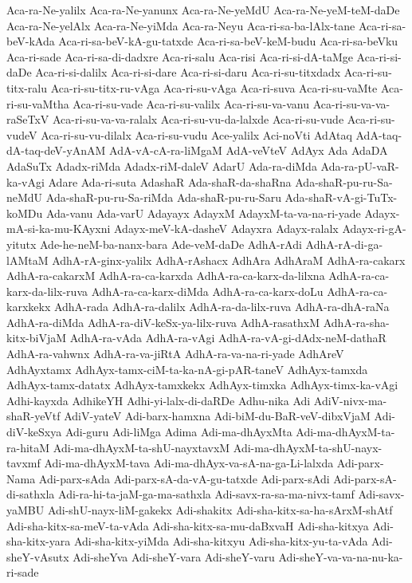 {Aca-ra-Ne-yalilx
Aca-ra-Ne-yanunx
Aca-ra-Ne-yeMdU
Aca-ra-Ne-yeM-teM-daDe
Aca-ra-Ne-yelAlx
Aca-ra-Ne-yiMda
Aca-ra-Neyu
Aca-ri-sa-ba-lAlx-tane
Aca-ri-sa-beV-kAda
Aca-ri-sa-beV-kA-gu-tatxde
Aca-ri-sa-beV-keM-budu
Aca-ri-sa-beVku
Aca-ri-sade
Aca-ri-sa-di-dadxre
Aca-ri-salu
Aca-risi
Aca-ri-si-dA-taMge
Aca-ri-si-daDe
Aca-ri-si-dalilx
Aca-ri-si-dare
Aca-ri-si-daru
Aca-ri-su-titxdadx
Aca-ri-su-titx-ralu
Aca-ri-su-titx-ru-vAga
Aca-ri-su-vAga
Aca-ri-suva
Aca-ri-su-vaMte
Aca-ri-su-vaMtha
Aca-ri-su-vade
Aca-ri-su-valilx
Aca-ri-su-va-vanu
Aca-ri-su-va-va-raSeTxV
Aca-ri-su-va-va-ralalx
Aca-ri-su-vu-da-lalxde
Aca-ri-su-vude
Aca-ri-su-vudeV
Aca-ri-su-vu-dilalx
Aca-ri-su-vudu
Ace-yalilx
Aci-noVti
AdAtaq
AdA-taq-dA-taq-deV-yAnAM
AdA-vA-cA-ra-liMgaM
AdA-veVteV
AdAyx
Ada
AdaDA
AdaSuTx
Adadx-riMda
Adadx-riM-daleV
AdarU
Ada-ra-diMda
Ada-ra-pU-vaR-ka-vAgi
Adare
Ada-ri-suta
AdashaR
Ada-shaR-da-shaRna
Ada-shaR-pu-ru-Sa-neMdU
Ada-shaR-pu-ru-Sa-riMda
Ada-shaR-pu-ru-Saru
Ada-shaR-vA-gi-TuTx-koMDu
Ada-vanu
Ada-varU
Adayayx
AdayxM
AdayxM-ta-va-na-ri-yade
Adayx-mA-si-ka-mu-KAyxni
Adayx-meV-kA-dasheV
Adayxra
Adayx-ralalx
Adayx-ri-gA-yitutx
Ade-he-neM-ba-nanx-bara
Ade-veM-daDe
AdhA-rAdi
AdhA-rA-di-ga-lAMtaM
AdhA-rA-ginx-yalilx
AdhA-rAshacx
AdhAra
AdhAraM
AdhA-ra-cakarx
AdhA-ra-cakarxM
AdhA-ra-ca-karxda
AdhA-ra-ca-karx-da-lilxna
AdhA-ra-ca-karx-da-lilx-ruva
AdhA-ra-ca-karx-diMda
AdhA-ra-ca-karx-doLu
AdhA-ra-ca-karxkekx
AdhA-rada
AdhA-ra-dalilx
AdhA-ra-da-lilx-ruva
AdhA-ra-dhA-raNa
AdhA-ra-diMda
AdhA-ra-diV-keSx-ya-lilx-ruva
AdhA-rasathxM
AdhA-ra-sha-kitx-biVjaM
AdhA-ra-vAda
AdhA-ra-vAgi
AdhA-ra-vA-gi-dAdx-neM-dathaR
AdhA-ra-vahwnx
AdhA-ra-va-jiRtA
AdhA-ra-va-na-ri-yade
AdhAreV
AdhAyxtamx
AdhAyx-tamx-ciM-ta-ka-nA-gi-pAR-taneV
AdhAyx-tamxda
AdhAyx-tamx-datatx
AdhAyx-tamxkekx
AdhAyx-timxka
AdhAyx-timx-ka-vAgi
Adhi-kayxda
AdhikeYH
Adhi-yi-lalx-di-daRDe
Adhu-nika
Adi
AdiV-nivx-ma-shaR-yeVtf
AdiV-yateV
Adi-barx-hamxna
Adi-biM-du-BaR-veV-dibxVjaM
Adi-diV-keSxya
Adi-guru
Adi-liMga
Adima
Adi-ma-dhAyxMta
Adi-ma-dhAyxM-ta-ra-hitaM
Adi-ma-dhAyxM-ta-shU-nayxtavxM
Adi-ma-dhAyxM-ta-shU-nayx-tavxmf
Adi-ma-dhAyxM-tava
Adi-ma-dhAyx-va-sA-na-ga-Li-lalxda
Adi-parx-Nama
Adi-parx-sAda
Adi-parx-sA-da-vA-gu-tatxde
Adi-parx-sAdi
Adi-parx-sA-di-sathxla
Adi-ra-hi-ta-jaM-ga-ma-sathxla
Adi-savx-ra-sa-ma-nivx-tamf
Adi-savx-yaMBU
Adi-shU-nayx-liM-gakekx
Adi-shakitx
Adi-sha-kitx-sa-ha-sArxM-shAtf
Adi-sha-kitx-sa-meV-ta-vAda
Adi-sha-kitx-sa-mu-daBxvaH
Adi-sha-kitxya
Adi-sha-kitx-yara
Adi-sha-kitx-yiMda
Adi-sha-kitxyu
Adi-sha-kitx-yu-ta-vAda
Adi-sheY-vAsutx
Adi-sheYva
Adi-sheY-vara
Adi-sheY-varu
Adi-sheY-va-va-na-nu-ka-ri-sade
}
